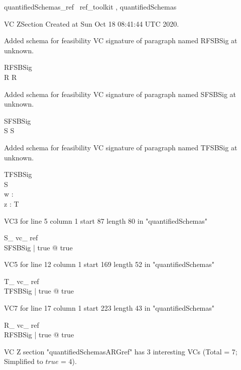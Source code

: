 \documentclass{article}
\begin{document}

\begin{zsection}	 \SECTION quantifiedSchemas\_ref \parents~ref\_toolkit , quantifiedSchemas
\end{zsection}

VC ZSection Created at Sun Oct 18 08:41:44 UTC 2020.


Added schema for feasibility VC signature of paragraph named RFSBSig at unknown.
\begin{schema}{RFSBSig}
\\
 R 
\where
 R
\end{schema}


Added schema for feasibility VC signature of paragraph named SFSBSig at unknown.
\begin{schema}{SFSBSig}
\\
 S 
\where
 S
\end{schema}


Added schema for feasibility VC signature of paragraph named TFSBSig at unknown.
\begin{schema}{TFSBSig}
\\
 S \\
 w : \nat \\
 z : \nat 
\where
 T
\end{schema}

VC3 for line 5 column 1 start 87 length 80 in "quantifiedSchemas"
\begin{theorem}{ S\_ vc\_ ref}\\
 \exists SFSBSig | true @ true \\

\end{theorem}

VC5 for line 12 column 1 start 169 length 52 in "quantifiedSchemas"
\begin{theorem}{ T\_ vc\_ ref}\\
 \exists TFSBSig | true @ true \\

\end{theorem}

VC7 for line 17 column 1 start 223 length 43 in "quantifiedSchemas"
\begin{theorem}{ R\_ vc\_ ref}\\
 \exists RFSBSig | true @ true \\

\end{theorem}



 VC Z section "quantifiedSchemasARGref" has $3$ interesting VCs (Total = 7; Simplified to $true$ = 4).



\end{document}
